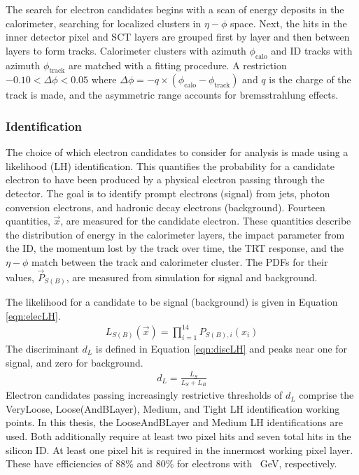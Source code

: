 The search for electron candidates begins with a scan of energy deposits in the calorimeter, searching for localized clusters in $\eta-\phi$ space.
Next, the hits in the inner detector pixel and SCT layers are grouped first by layer and then between layers to form tracks.
Calorimeter clusters with azimuth $\phi_\text{calo}$ and ID tracks with azimuth $\phi_\text{track}$ are matched with a fitting procedure.
A restriction $-0.10<\Delta\phi<0.05$ where $\Delta\phi=-q\times(\phi_\text{calo}-\phi_\text{track})$ and $q$ is the charge of the track is made, and the asymmetric range accounts for bremsstrahlung effects. \cite{elecReco}

\subsubsection{Identification}

The choice of which electron candidates to consider for analysis is made using a likelihood (LH) identification.
This quantifies the probability for a candidate electron to have been produced by a physical electron passing through the detector.
The goal is to identify prompt electrons (signal) from jets, photon conversion electrons, and hadronic decay electrons (background).
Fourteen quantities, $\vec{x}$, are measured for the candidate electron.
These quantities describe the distribution of energy in the calorimeter layers, the impact parameter from the ID, the momentum lost by the track over time, the TRT response, and the $\eta-\phi$ match between the track and calorimeter cluster.
The PDFs for their values, $\vec{P}_{S(B)}$, are measured from simulation for signal and background.

The likelihood for a candidate to be signal (background) is given in Equation \ref{eqn:elecLH}.
\begin{equation}\begin{split}\label{eqn:elecLH}
L_{S(B)}(\vec{x}) = \prod_{i=1}^{14}P_{S(B),i}(x_i)
\end{split}\end{equation}
The discriminant $d_L$ is defined in Equation \ref{eqn:discLH} and peaks near one for signal, and zero for background.
\begin{equation}\begin{split}
d_L=\frac{L_S}{L_S+L_B}
\end{split}\end{equation} 
Electron candidates passing increasingly restrictive thresholds of $d_L$ comprise the VeryLoose, Loose(AndBLayer), Medium, and Tight LH identification working points.
In this thesis, the LooseAndBLayer and Medium LH identifications are used.
Both additionally require at least two pixel hits and seven total hits in the silicon ID.
At least one pixel hit is required in the innermost working pixel layer.
These have efficiencies of 88\% and 80\% for electrons with ~GeV, respectively.


